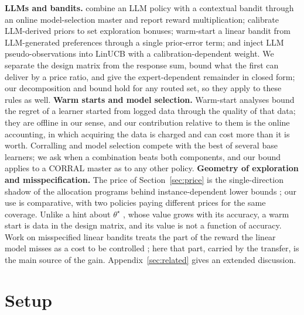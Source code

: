 \documentclass{article}
\theoremstyle{definition}
\theoremstyle{remark}
\theoremstyle{remark}
\begin{document}
\textbf{LLMs and bandits.} \cite{chen2024llmdecision} combine an LLM policy
with a contextual bandit through an online model-selection master and report
reward multiplication; \cite{huangcontextual} calibrate LLM-derived priors to
set exploration bonuses; \cite{jumpstart2026} warm-start a linear bandit from
LLM-generated preferences through a single prior-error term; and
\cite{calibgated2026} inject LLM pseudo-observations into LinUCB with a
calibration-dependent weight. We separate the design matrix from the response
sum, bound what the first can deliver by a price ratio, and give the
expert-dependent remainder in closed form; our decomposition and bound hold
for any routed set, so they apply to these rules as well.
\textbf{Warm starts and model selection.} Warm-start analyses
\cite{bastani2021mostly,zhang2019warm} bound the regret of a learner started
from logged data through the quality of that data; they are offline in our
sense, and our contribution relative to them is the online accounting, in
which acquiring the data is charged and can cost more than it is worth.
Corralling and model selection
\cite{agarwal2017corralling,pacchiano2020model,marinov2021pareto} compete
with the best of several base learners; we ask when a combination beats both
components, and our bound applies to a CORRAL master as to any other policy.
\textbf{Geometry of exploration and misspecification.} The price of
Section~\ref{sec:price} is the single-direction shadow of the allocation
programs behind instance-dependent lower bounds
\cite{graves1997asymptotically,lattimore2017end}; our use is comparative,
with two policies paying different prices for the same coverage. Unlike a
hint about $\theta^\star$ \cite{cutkosky2022leveraging}, whose value grows
with its accuracy, a warm start is data in the design matrix, and its value
is not a function of accuracy. Work on misspecified linear bandits treats the
part of the reward the linear model misses as a cost to be controlled
\cite{ghosh2017misspecified,lattimore2020learning,foster2020adapting}; here that part, carried by the transfer,
is the main source of the gain. Appendix~\ref{sec:related} gives an extended
discussion.

\section{Setup}
\label{sec:setup}
\label{sec:preliminaries}
\end{document}
